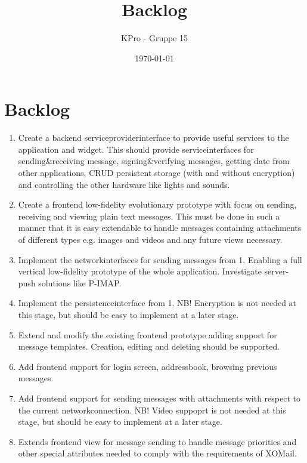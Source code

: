 \documentclass[a4paper, norsk, 12pt]{article}
\author{KPro - Gruppe 15}
\title{Backlog}
\date{\today}
\begin{document}
	\maketitle
	\pagebreak
	\section{Backlog}
		\begin{enumerate}
			\item Create a backend serviceproviderinterface to provide useful services to the application and widget. 
				This should provide serviceinterfaces for sending\&receiving message, signing\&verifying messages, 
				getting date from other applications, CRUD persistent storage (with and without encryption) and 
				controlling the other hardware like lights and sounds.
				
			\item Create a frontend low-fidelity evolutionary prototype with focus on sending, receiving and viewing plain text messages. 
				This must be done in such a manner that it is easy extendable to handle messages containing attachments of different types e.g. images and videos and any future views necessary.
				
			\item	Implement the networkinterfaces for sending messages from 1. 
				Enabling a full vertical low-fidelity prototype of the whole application.
				Investigate server-push solutions like P-IMAP.
				
			\item Implement the persistenceinterface from 1. 
				NB! Encryption is not needed at this stage, but should be easy to implement at a later stage.
				
			\item Extend and modify the existing frontend prototype adding support for message templates. 
				Creation, editing and deleting should be supported.
				
			\item Add frontend support for login screen, addressbook, browsing previous messages.
			
			\item Add frontend support for sending messages with attachments with respect to the current networkconnection. 
				NB! Video suppoprt is not needed at this stage, but should be easy to implement at a later stage.
				
			\item Extends frontend view for message sending to handle message priorities and other special attributes needed to comply with the requirements of XOMail.
			

\end{enumerate}
\end{document}
